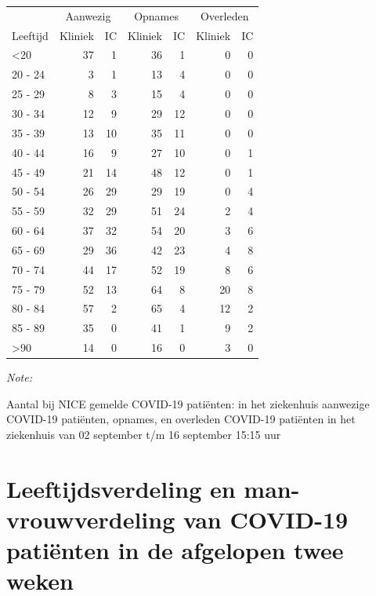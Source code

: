 \documentclass[
  english,
  man,floatsintext]{apa6}
\begin{document}
\begin{table}
\centering\begingroup\fontsize{10}{12}\selectfont

\begin{threeparttable}
\begin{tabular}{lrrrrrr}
\toprule
\multicolumn{1}{c}{ } & \multicolumn{2}{c}{Aanwezig} & \multicolumn{2}{c}{Opnames} & \multicolumn{2}{c}{Overleden} \\
\cmidrule(l{3pt}r{3pt}){2-3} \cmidrule(l{3pt}r{3pt}){4-5} \cmidrule(l{3pt}r{3pt}){6-7}
Leeftijd & Kliniek & IC & Kliniek & IC & Kliniek & IC\\
\midrule
<20 & 37 & 1 & 36 & 1 & 0 & 0\\
20 - 24 & 3 & 1 & 13 & 4 & 0 & 0\\
25 - 29 & 8 & 3 & 15 & 4 & 0 & 0\\
30 - 34 & 12 & 9 & 29 & 12 & 0 & 0\\
35 - 39 & 13 & 10 & 35 & 11 & 0 & 0\\
40 - 44 & 16 & 9 & 27 & 10 & 0 & 1\\
45 - 49 & 21 & 14 & 48 & 12 & 0 & 1\\
50 - 54 & 26 & 29 & 29 & 19 & 0 & 4\\
55 - 59 & 32 & 29 & 51 & 24 & 2 & 4\\
60 - 64 & 37 & 32 & 54 & 20 & 3 & 6\\
65 - 69 & 29 & 36 & 42 & 23 & 4 & 8\\
70 - 74 & 44 & 17 & 52 & 19 & 8 & 6\\
75 - 79 & 52 & 13 & 64 & 8 & 20 & 8\\
80 - 84 & 57 & 2 & 65 & 4 & 12 & 2\\
85 - 89 & 35 & 0 & 41 & 1 & 9 & 2\\
>90 & 14 & 0 & 16 & 0 & 3 & 0\\
\bottomrule
\end{tabular}
\begin{tablenotes}
\item \textit{Note: } 
\item Aantal bij NICE gemelde COVID-19 patiënten: in het ziekenhuis aanwezige COVID-19 patiënten, opnames, en overleden COVID-19 patiënten in het ziekenhuis van 02 september t/m 16 september 15:15 uur
\end{tablenotes}
\end{threeparttable}
\endgroup{}
\end{table}

\newpage

\hypertarget{leeftijdsverdeling-en-man-vrouwverdeling-van-covid-19-patiuxebnten-in-de-afgelopen-twee-weken}{%
\section{Leeftijdsverdeling en man-vrouwverdeling van COVID-19 patiënten in de afgelopen twee weken}\label{leeftijdsverdeling-en-man-vrouwverdeling-van-covid-19-patiuxebnten-in-de-afgelopen-twee-weken}}
\end{document}
